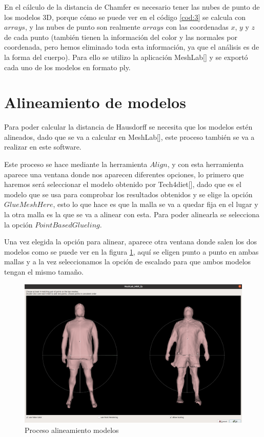 En el cálculo de la distancia de Chamfer es necesario tener las nubes de punto de los modelos 3D, porque cómo se puede ver en el código \ref{cod:3} se calcula con $arrays$, y las nubes de punto son realmente $arrays$ con las coordenadas $x$, $y$ y $z$ de cada punto (también tienen la información del color y las normales por coordenada, pero hemos eliminado toda esta información, ya que el análisis es de la forma del cuerpo). Para ello se utilizo la aplicación MeshLab[\cite{MeshLab}] y se exportó cada uno de los modelos en formato ply.

\section{Alineamiento de modelos}

Para poder calcular la distancia de Hausdorff se necesita que los modelos estén alineados, dado que se va a calcular en MeshLab[\cite{MeshLab}], este proceso también se va a realizar en este software.

Este proceso se hace mediante la herramienta $Align$, y con esta herramienta aparece una ventana donde nos aparecen diferentes opciones, lo primero que haremos será seleccionar el modelo obtenido por Tech4diet[\cite{tech}], dado que es el modelo que se usa para comprobar los resultados obtenidos y se elige la opción $Glue Mesh Here$, esto lo que hace es que la malla se va a quedar fija en el lugar y la otra malla es la que se va a alinear con esta. Para poder alinearla se selecciona la opción $Point Based Glueling$.

Una vez elegida la opción para alinear, aparece otra ventana donde salen los dos modelos como se puede ver en la figura \ref{fig:figura10}, aquí se eligen punto a punto en ambas mallas y a la vez seleccionamos la opción de escalado para que ambos modelos tengan el mismo tamaño.

\begin{figure}[H]
	\centering
	\includegraphics[scale=0.22]{imagenes/alineamiento.png}
	\caption{Proceso alineamiento modelos}
	\label{fig:figura10}
\end{figure}


